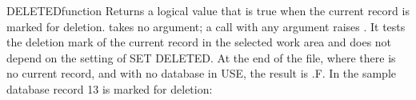\begin{XbaseEntry}{DELETED}{function}
Returns a logical value that is true when the current record is marked for deletion.
\Syntax
{}
\Usage
{} takes no argument; a call with any argument raises . It tests the deletion mark of the current record in the selected work area and does not depend on the setting of SET DELETED. At the end of the file, where there is no current record, and with no database in USE, the result is .F.
\Examples
In the sample database record 13 is marked for deletion:
\end{XbaseEntry}

